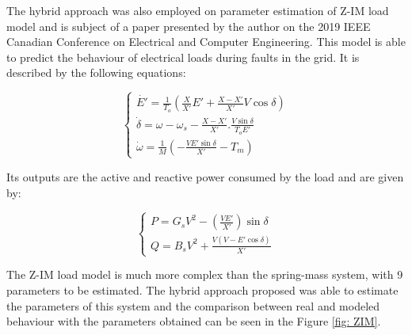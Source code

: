 The hybrid approach was also employed on parameter estimation of Z-IM load model and is subject of a paper presented by the author on the 2019 IEEE Canadian Conference on Electrical and Computer Engineering. This model is able to predict the behaviour of electrical loads during faults in the grid. It is described by the following equations:

\begin{equation}
    \begin{cases}
        \dot{E'} = \frac{1}{T_o}\left(\frac{X}{X'}E' + \frac{X - X'}{X'}V\cos\delta\right) \\
        \dot{\delta} = \omega - \omega_s - \frac{X - X'}{X'}.\frac{V\sin\delta}{T_o E'} \\
        \dot{\omega} = \frac{1}{M}\left(-\frac{VE'\sin\delta}{X'} - T_m\right)
    \end{cases}
    \label{eq: xZIM}
\end{equation}

Its outputs are the active and reactive power consumed by the load and are given by:

\begin{equation}
    \begin{cases}
        P = G_sV^2 - \left(\frac{VE'}{X'}\right)\sin\delta \\
        Q = B_sV^2 + \frac{V(V - E'\cos\delta)}{X'}
    \end{cases}
    \label{eq: yZIM}
\end{equation}

The Z-IM load model is much more complex than the spring-mass system, with 9 parameters to be estimated. The hybrid approach proposed was able to estimate the parameters of this system and the comparison between real and modeled behaviour with the parameters obtained can be seen in the Figure \ref{fig: ZIM}.

